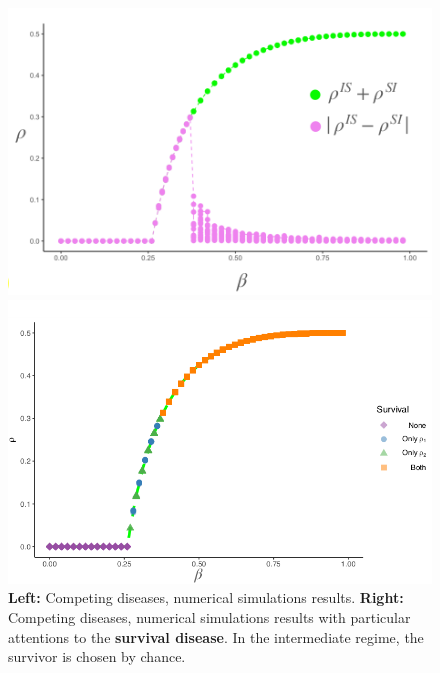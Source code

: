 \documentclass[../main/main.tex]{subfiles}
\begin{document}
\begin{figure}[h!]
\begin{minipage}[c]{0.5\linewidth}
\centering
\includegraphics[width=1\textwidth]{../lessons/image/11/image008.png}
\end{minipage}
\begin{minipage}[]{0.5\linewidth}
\centering
\includegraphics[width=1\textwidth]{../lessons/image/11/image009.png}
\end{minipage}
\caption{\label{fig:11_009} \textbf{Left:} Competing diseases, numerical simulations results. \textbf{Right:} Competing diseases, numerical simulations results with particular attentions to the \textbf{survival disease}. In the intermediate regime, the survivor is chosen by chance. }
\end{figure}
\end{document}
